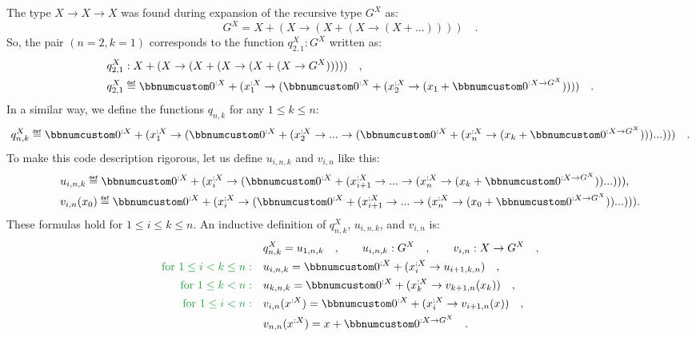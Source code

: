 The type $X\rightarrow X\rightarrow X$ was found during expansion
of the recursive type $G^{X}$ as:
\[
G^{X}=X+(X\rightarrow(X+(X\rightarrow(X+...))))\quad.
\]
So, the pair $\left(n=2,k=1\right)$ corresponds to the function $q_{2,1}^{X}:G^{X}$
written as: 
\begin{align*}
 & q_{2,1}^{X}:X+(X\rightarrow(X+(X\rightarrow(X+(X\rightarrow G^{X})))))\quad,\\
 & q_{2,1}^{X}\triangleq\bbnum 0^{:X}+(x_{1}^{:X}\rightarrow(\bbnum 0^{:X}+(x_{2}^{:X}\rightarrow(x_{1}+\bbnum 0^{:X\rightarrow G^{X}}))))\quad.
\end{align*}
In a similar way, we define the functions $q_{n,k}$ for any $1\le k\le n$:
\[
q_{n,k}^{X}\triangleq\bbnum 0^{:X}+(x_{1}^{:X}\rightarrow(\bbnum 0^{:X}+(x_{2}^{:X}\rightarrow...\rightarrow(\bbnum 0^{:X}+(x_{n}^{:X}\rightarrow(x_{k}+\bbnum 0^{:X\rightarrow G^{X}})))...)))\quad.
\]
To make this code description rigorous, let us define $u_{i,n,k}$
and $v_{i,n}$ like this:
\begin{align*}
 & u_{i,n,k}\triangleq\bbnum 0^{:X}+(x_{i}^{:X}\rightarrow(\bbnum 0^{:X}+(x_{i+1}^{:X}\rightarrow...\rightarrow(x_{n}^{:X}\rightarrow(x_{k}+\bbnum 0^{:X\rightarrow G^{X}}))...))),\\
 & v_{i,n}(x_{0})\triangleq\bbnum 0^{:X}+(x_{i}^{:X}\rightarrow(\bbnum 0^{:X}+(x_{i+1}^{:X}\rightarrow...\rightarrow(x_{n}^{:X}\rightarrow(x_{0}+\bbnum 0^{:X\rightarrow G^{X}}))...))).
\end{align*}
These formulas hold for $1\le i\le k\le n$. An inductive definition
of $q_{n,k}^{X}$, $u_{i,n,k}$, and $v_{i,n}$ is:
\begin{align*}
 & q_{n,k}^{X}=u_{1,n,k}\quad,\quad\quad u_{i,n,k}:G^{X}\quad,\quad\quad v_{i,n}:X\rightarrow G^{X}\quad,\\
{\color{greenunder}\text{for }1\le i<k\le n:}\quad & u_{i,n,k}=\bbnum 0^{:X}+(x_{i}^{:X}\rightarrow u_{i+1,k,n})\quad,\\
{\color{greenunder}\text{for }1\le k<n:}\quad & u_{k,n,k}=\bbnum 0^{:X}+(x_{k}^{:X}\rightarrow v_{k+1,n}(x_{k}))\quad,\\
{\color{greenunder}\text{for }1\le i<n:}\quad & v_{i,n}(x^{:X})=\bbnum 0^{:X}+(x_{i}^{:X}\rightarrow v_{i+1,n}(x))\quad,\\
 & v_{n,n}(x^{:X})=x+\bbnum 0^{:X\rightarrow G^{X}}\quad.
\end{align*}

